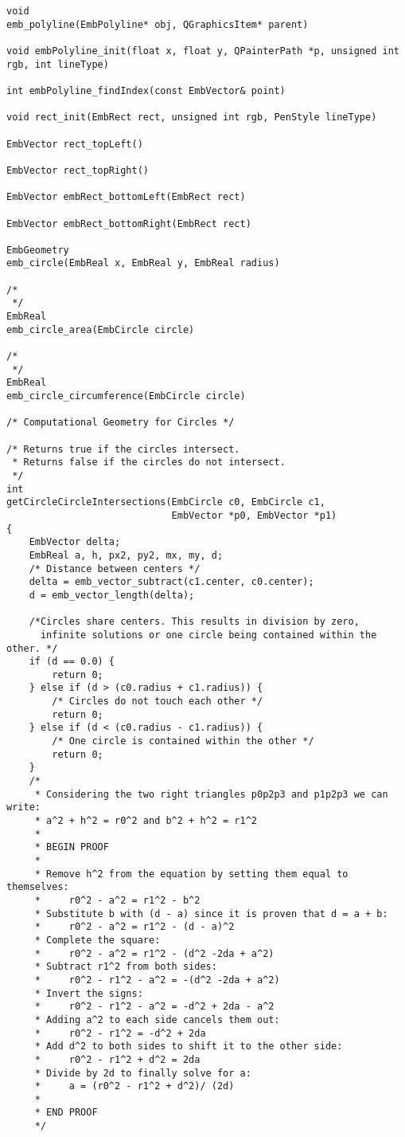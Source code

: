 \begin{lstlisting}
void
emb_polyline(EmbPolyline* obj, QGraphicsItem* parent)

void embPolyline_init(float x, float y, QPainterPath *p, unsigned int rgb, int lineType)

int embPolyline_findIndex(const EmbVector& point)

void rect_init(EmbRect rect, unsigned int rgb, PenStyle lineType)

EmbVector rect_topLeft()

EmbVector rect_topRight()

EmbVector embRect_bottomLeft(EmbRect rect)

EmbVector embRect_bottomRight(EmbRect rect)

EmbGeometry
emb_circle(EmbReal x, EmbReal y, EmbReal radius)

/*
 */
EmbReal
emb_circle_area(EmbCircle circle)

/*
 */
EmbReal
emb_circle_circumference(EmbCircle circle)

/* Computational Geometry for Circles */

/* Returns true if the circles intersect.
 * Returns false if the circles do not intersect.
 */
int
getCircleCircleIntersections(EmbCircle c0, EmbCircle c1,
                             EmbVector *p0, EmbVector *p1)
{
    EmbVector delta;
    EmbReal a, h, px2, py2, mx, my, d;
    /* Distance between centers */
    delta = emb_vector_subtract(c1.center, c0.center);
    d = emb_vector_length(delta);

    /*Circles share centers. This results in division by zero,
      infinite solutions or one circle being contained within the other. */
    if (d == 0.0) {
        return 0;
    } else if (d > (c0.radius + c1.radius)) {
        /* Circles do not touch each other */
        return 0;
    } else if (d < (c0.radius - c1.radius)) {
        /* One circle is contained within the other */
        return 0;
    }
    /*
     * Considering the two right triangles p0p2p3 and p1p2p3 we can write:
     * a^2 + h^2 = r0^2 and b^2 + h^2 = r1^2
     *
     * BEGIN PROOF
     *
     * Remove h^2 from the equation by setting them equal to themselves:
     *     r0^2 - a^2 = r1^2 - b^2
     * Substitute b with (d - a) since it is proven that d = a + b:
     *     r0^2 - a^2 = r1^2 - (d - a)^2
     * Complete the square:
     *     r0^2 - a^2 = r1^2 - (d^2 -2da + a^2)
     * Subtract r1^2 from both sides:
     *     r0^2 - r1^2 - a^2 = -(d^2 -2da + a^2)
     * Invert the signs:
     *     r0^2 - r1^2 - a^2 = -d^2 + 2da - a^2
     * Adding a^2 to each side cancels them out:
     *     r0^2 - r1^2 = -d^2 + 2da
     * Add d^2 to both sides to shift it to the other side:
     *     r0^2 - r1^2 + d^2 = 2da
     * Divide by 2d to finally solve for a:
     *     a = (r0^2 - r1^2 + d^2)/ (2d)
     *
     * END PROOF
     */


\end{lstlisting}
